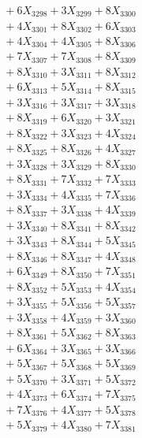 \documentclass[a4paper,10pt]{article}
\begin{document}
{\begin{align}
&\;  + 6 X_{3298} + 3 X_{3299} + 8 X_{3300} \\[0.3ex]
&\;  + 4 X_{3301} + 8 X_{3302} + 6 X_{3303} \\[0.3ex]
&\;  + 4 X_{3304} + 4 X_{3305} + 8 X_{3306} \\[0.3ex]
&\;  + 7 X_{3307} + 7 X_{3308} + 8 X_{3309} \\[0.5ex]\allowbreak
&\;  + 8 X_{3310} + 3 X_{3311} + 8 X_{3312} \\[0.3ex]
&\;  + 6 X_{3313} + 5 X_{3314} + 8 X_{3315} \\[0.3ex]
&\;  + 3 X_{3316} + 3 X_{3317} + 3 X_{3318} \\[0.3ex]
&\;  + 8 X_{3319} + 6 X_{3320} + 3 X_{3321} \\[0.3ex]
&\;  + 8 X_{3322} + 3 X_{3323} + 4 X_{3324} \\[0.3ex]
&\;  + 8 X_{3325} + 8 X_{3326} + 4 X_{3327} \\[0.3ex]
&\;  + 3 X_{3328} + 3 X_{3329} + 8 X_{3330} \\[0.3ex]
&\;  + 8 X_{3331} + 7 X_{3332} + 7 X_{3333} \\[0.3ex]
&\;  + 3 X_{3334} + 4 X_{3335} + 7 X_{3336} \\[0.3ex]
&\;  + 8 X_{3337} + 3 X_{3338} + 4 X_{3339} \\[0.5ex]\allowbreak
&\;  + 3 X_{3340} + 8 X_{3341} + 8 X_{3342} \\[0.3ex]
&\;  + 3 X_{3343} + 8 X_{3344} + 5 X_{3345} \\[0.3ex]
&\;  + 8 X_{3346} + 8 X_{3347} + 4 X_{3348} \\[0.3ex]
&\;  + 6 X_{3349} + 8 X_{3350} + 7 X_{3351} \\[0.3ex]
&\;  + 8 X_{3352} + 5 X_{3353} + 4 X_{3354} \\[0.3ex]
&\;  + 3 X_{3355} + 5 X_{3356} + 5 X_{3357} \\[0.3ex]
&\;  + 3 X_{3358} + 4 X_{3359} + 3 X_{3360} \\[0.3ex]
&\;  + 8 X_{3361} + 5 X_{3362} + 8 X_{3363} \\[0.3ex]
&\;  + 6 X_{3364} + 3 X_{3365} + 3 X_{3366} \\[0.3ex]
&\;  + 5 X_{3367} + 5 X_{3368} + 5 X_{3369} \\[0.5ex]\allowbreak
&\;  + 5 X_{3370} + 3 X_{3371} + 5 X_{3372} \\[0.3ex]
&\;  + 4 X_{3373} + 6 X_{3374} + 7 X_{3375} \\[0.3ex]
&\;  + 7 X_{3376} + 4 X_{3377} + 5 X_{3378} \\[0.3ex]
&\;  + 5 X_{3379} + 4 X_{3380} + 7 X_{3381} \\[0.3ex]

\end{align}}
\end{document}
